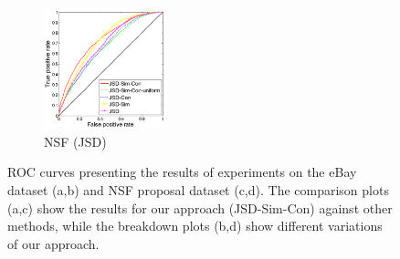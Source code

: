 \documentclass{article} %
\begin{document}
\begin{figure}
        \begin{subfigure}[b]{0.24\textwidth}
        	        \centering
                \includegraphics[width=36mm]{figures/nsf-breakdown-kopia.png}
               \caption{NSF (JSD)}
                \label{fig:nsf-breakdown}
        \end{subfigure}
       \caption{ROC curves presenting the results of experiments on
         the eBay dataset (a,b) and NSF proposal dataset (c,d). The
         comparison plots (a,c) show the results for our approach (JSD-Sim-Con)
         against other methods, while the breakdown plots (b,d)
         show different variations of our approach. }\label{fig:roc-curves}
\end{figure}

\end{document}
